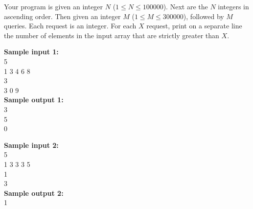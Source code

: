 \documentclass[a4paper]{article}
\begin{document}
Your program is given an integer $N$ ($1 \le N \le 100000$). Next are the $N$ integers in ascending order. Then given an integer $M$ ($1 \le M \le 300000$), followed by $M$ queries. Each request is an integer. For each $X$ request, print on a separate line the number of elements in the input array that are strictly greater than $X$.

\LINE

\noindent \textbf{Sample input 1:}\\
5\\
1 3 4 6 8\\
3\\
3 0 9\\

\noindent \textbf{Sample output 1:}\\
3\\
5\\
0\\

\SPACE

\noindent \textbf{Sample input 2:}\\
5\\
1 3 3 3 5\\
1\\
3\\

\noindent \textbf{Sample output 2:}\\
1\\
\end{document}
